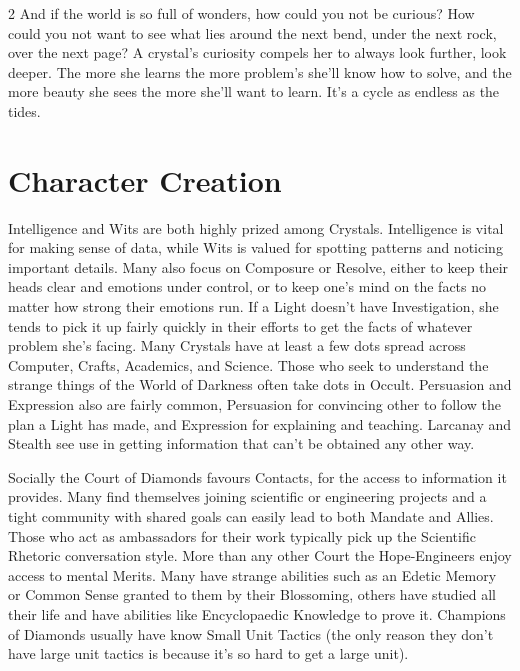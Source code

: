 \begin{multicols}{2}
And if the world is so full of wonders, how could you not be curious? How could you not want to see what lies around the next bend, under the next rock, over the next page? A crystal's curiosity compels her to always look further, look deeper. The more she learns the more problem's she'll know how to solve, and the more beauty she sees the more she'll want to learn. It's a cycle as endless as the tides. 

\section*{Character Creation}
Intelligence and Wits are both highly prized among Crystals. Intelligence is vital for making sense of data, while Wits is valued for spotting patterns and noticing important details. Many also focus on Composure or Resolve, either to keep their heads clear and emotions under control, or to keep one's mind on the facts no matter how strong their emotions run. If a Light doesn't have Investigation, she tends to pick it up fairly quickly in their efforts to get the facts of whatever problem she's facing. Many Crystals have at least a few dots spread across Computer, Crafts, Academics, and Science. Those who seek to understand the strange things of the World of Darkness often take dots in Occult. Persuasion and Expression also are fairly common, Persuasion for convincing other to follow the plan a Light has made, and Expression for explaining and teaching. Larcanay and Stealth see use in getting information that can't be obtained any other way.

Socially the Court of Diamonds favours Contacts, for the access to information it provides. Many find themselves joining scientific or engineering projects and a tight community with shared goals can easily lead to both Mandate and Allies. Those who act as ambassadors for their work typically pick up the Scientific Rhetoric conversation style. More than any other Court the Hope-Engineers enjoy access to mental Merits. Many have strange abilities such as an Edetic Memory or Common Sense granted to them by their Blossoming, others have studied all their life and have abilities like Encyclopaedic Knowledge to prove it. Champions of Diamonds usually have know Small Unit Tactics (the only reason they don't have large unit tactics is because it's so hard to get a large unit).


\end{multicols}
